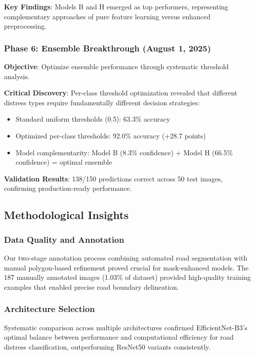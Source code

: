 \documentclass[12pt,twocolumn]{article}
\begin{document}
\textbf{Key Findings}: Models B and H emerged as top performers, representing complementary approaches of pure feature learning versus enhanced preprocessing.

\subsubsection{Phase 6: Ensemble Breakthrough (August 1, 2025)}

\textbf{Objective}: Optimize ensemble performance through systematic threshold analysis.

\textbf{Critical Discovery}: Per-class threshold optimization revealed that different distress types require fundamentally different decision strategies:

\begin{itemize}[itemsep=1pt,parsep=0pt,topsep=2pt]
\item Standard uniform thresholds (0.5): 63.3\% accuracy
\item Optimized per-class thresholds: 92.0\% accuracy (+28.7 points)
\item Model complementarity: Model B (8.3\% confidence) + Model H (66.5\% confidence) = optimal ensemble
\end{itemize}

\textbf{Validation Results}: 138/150 predictions correct across 50 test images, confirming production-ready performance.

\subsection{Methodological Insights}

\subsubsection{Data Quality and Annotation}

Our two-stage annotation process combining automated road segmentation with manual polygon-based refinement proved crucial for mask-enhanced models. The 187 manually annotated images (1.03\% of dataset) provided high-quality training examples that enabled precise road boundary delineation.

\subsubsection{Architecture Selection}

Systematic comparison across multiple architectures confirmed EfficientNet-B3's optimal balance between performance and computational efficiency for road distress classification, outperforming ResNet50 variants consistently.
\end{document}
